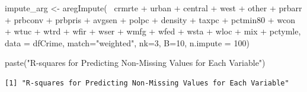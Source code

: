 \documentclass[]{article}
\newenvironment{Shaded}{}{}
\newcommand{\DataTypeTok}[1]{#1}
\newcommand{\DecValTok}[1]{#1}
\newcommand{\KeywordTok}[1]{\textcolor[rgb]{0.00,0.00,1.00}{#1}}
\newcommand{\NormalTok}[1]{#1}
\newcommand{\OperatorTok}[1]{#1}
\newcommand{\StringTok}[1]{\textcolor[rgb]{0.00,0.50,0.50}{#1}}
\begin{document}
\begin{Shaded}
\begin{Highlighting}[]
\NormalTok{impute_arg <-}\StringTok{ }\KeywordTok{aregImpute}\NormalTok{(}\OperatorTok{~}\StringTok{ }\NormalTok{crmrte }\OperatorTok{+}\StringTok{  }\NormalTok{urban }\OperatorTok{+}\StringTok{ }\NormalTok{central }\OperatorTok{+}\StringTok{ }\NormalTok{west }\OperatorTok{+}\StringTok{ }\NormalTok{other }\OperatorTok{+}
\StringTok{                         }\NormalTok{prbarr }\OperatorTok{+}\StringTok{ }\NormalTok{prbconv }\OperatorTok{+}\StringTok{ }\NormalTok{prbpris }\OperatorTok{+}\StringTok{ }\NormalTok{avgsen }\OperatorTok{+}\StringTok{ }\NormalTok{polpc }\OperatorTok{+}\StringTok{ }
\StringTok{                         }\NormalTok{density }\OperatorTok{+}\StringTok{ }\NormalTok{taxpc }\OperatorTok{+}\StringTok{ }\NormalTok{pctmin80 }\OperatorTok{+}\StringTok{ }\NormalTok{wcon }\OperatorTok{+}\StringTok{ }\NormalTok{wtuc }\OperatorTok{+}
\StringTok{                         }\NormalTok{wtrd }\OperatorTok{+}\StringTok{ }\NormalTok{wfir }\OperatorTok{+}\StringTok{ }\NormalTok{wser }\OperatorTok{+}\StringTok{ }\NormalTok{wmfg }\OperatorTok{+}\StringTok{ }\NormalTok{wfed }\OperatorTok{+}\StringTok{ }\NormalTok{wsta }\OperatorTok{+}\StringTok{ }\NormalTok{wloc }\OperatorTok{+}
\StringTok{                         }\NormalTok{mix }\OperatorTok{+}\StringTok{ }\NormalTok{pctymle, }\DataTypeTok{data =}\NormalTok{ dfCrime, }\DataTypeTok{match=}\StringTok{"weighted"}\NormalTok{,}
                         \DataTypeTok{nk=}\DecValTok{3}\NormalTok{, }\DataTypeTok{B=}\DecValTok{10}\NormalTok{, }\DataTypeTok{n.impute =} \DecValTok{100}\NormalTok{)}
\end{Highlighting}
\end{Shaded}

\begin{Shaded}
\begin{Highlighting}[]
\KeywordTok{paste}\NormalTok{(}\StringTok{"R-squares for Predicting Non-Missing Values for Each Variable"}\NormalTok{)}
\end{Highlighting}
\end{Shaded}

\begin{verbatim}
[1] "R-squares for Predicting Non-Missing Values for Each Variable"
\end{verbatim}

\begin{Shaded}
\end{Shaded}
\end{document}
